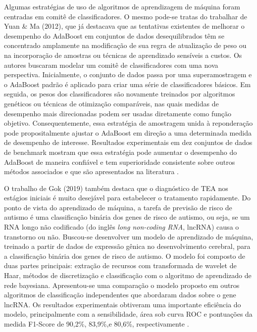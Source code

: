 \documentclass{template/sig-alternate-05-2015}
\begin{document}
Algumas estratégias de uso de algoritmos de aprendizagem de máquina
foram centradas em comitê de classificadores. O mesmo pode-se tratas
do trabalhar de Yuan \& Ma (2012), que já destacava que as tentativas
existentes de melhorar o desempenho do AdaBoost em conjuntos de dados
desequilibrados têm se concentrado amplamente na modificação de sua
regra de atualização de peso ou na incorporação de amostras ou
técnicas de aprendizado sensíveis a custos. Os autores buscaram
modelar um comitê de classificadores com uma nova
perspectiva. Inicialmente, o conjunto de dados passa por uma
superamostragem e o AdaBoost padrão é aplicado para criar uma série de
classificadores básicos. Em seguida, os pesos dos classificadores são
novamente treinados por algoritmos genéticos ou técnicas de otimização
comparáveis, nas quais medidas de desempenho mais direcionadas podem
ser usadas diretamente como função objetivo. Consequentemente, essa
estratégia de amostragem unida à reponderação pode propositalmente
ajustar o AdaBoost em direção a uma determinada medida de desempenho
de interesse. Resultados experimentais em dez conjuntos de dados de
benchmark mostram que essa estratégia pode aumentar o desempenho do
AdaBoost de maneira confiável e tem superioridade consistente sobre
outros métodos associados e que são apresentados na literatura
\cite{Yuan:2012}.

O trabalho de Gok (2019) também destaca que o diagnóstico de TEA nos
estágios iniciais é muito desejável para estabelecer o tratamento
rapidamente. Do ponto de vista do aprendizado de máquina, a tarefa de
previsão de risco de autismo é uma classificação binária dos genes de
risco de autismo, ou seja, se um RNA longo não codificado (do inglês
\textit{long non-coding RNA}, lncRNA) causa o transtorno ou
não. Buscou-se desenvolver um modelo de aprendizado de máquina,
treinado a partir de dados de expressão gênica no desenvolvimento
cerebral, para a classificação binária dos genes de risco de
autismo. O modelo foi composto de duas partes principais: extração de
recursos com transformada de wavelet de Haar, métodos de discretização
e classificação com o algoritmo de aprendizado de rede
bayesiana. Apresentou-se uma comparação o modelo proposto em outros
algoritmos de classificação independentes que abordaram dados sobre o
gene lncRNA. Os resultados experimentais obtiveram uma importante
eficiência do modelo, principalmente com a sensibilidade, área sob
curva ROC e pontuações da medida F1-Score de 90,2\%, 83,9\%,e 80,6\%,
respectivamente \cite{Gok:2019}.
\end{document}
